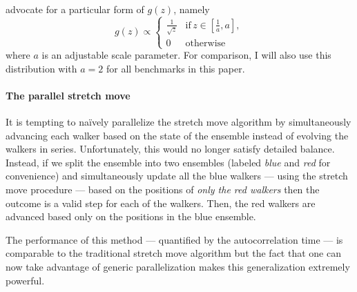 \documentclass[preprint]{aastex}
\begin{document}
\citet{Goodman:2010} advocate for a particular form of $g(z)$, namely
\begin{equation}
    g(z) \propto \left \{ \begin{array}{ll}
        \displaystyle\frac{1}{\sqrt{z}} & \mathrm{if}\, z\in \left [ \displaystyle\frac{1}{a}, a \right ], \\
        0 & \mathrm{otherwise}
    \end{array} \right .
\end{equation}
where $a$ is an adjustable scale parameter. For comparison, I will also use this
distribution with $a=2$ for all benchmarks in this paper.

\paragraph{The parallel stretch move}

It is tempting to na\"ively parallelize the stretch move algorithm by simultaneously
advancing each walker based on the state of the ensemble instead of evolving the
walkers in series. Unfortunately, this would no longer satisfy detailed balance.
Instead, if we split the ensemble into two ensembles (labeled \emph{blue} and
\emph{red} for convenience) and simultaneously update all the blue walkers ---
using the stretch move procedure --- based on the positions of \emph{only the red
walkers} then the outcome is a valid step for each of the walkers. Then,
the red walkers are advanced based only on the positions in the blue ensemble.

The performance of this method --- quantified by the autocorrelation time --- is
comparable to the traditional stretch move algorithm but the fact that one can now
take advantage of generic parallelization makes this generalization extremely
powerful.




\end{document}
